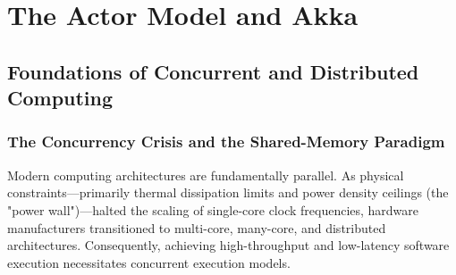 \chapter{The Actor Model and Akka}

\section{Foundations of Concurrent and Distributed Computing}

\subsection{The Concurrency Crisis and the Shared-Memory Paradigm}
Modern computing architectures are fundamentally parallel. As physical constraints—primarily thermal dissipation limits and power density ceilings (the "power wall")—halted the scaling of single-core clock frequencies, hardware manufacturers transitioned to multi-core, many-core, and distributed architectures. Consequently, achieving high-throughput and low-latency software execution necessitates concurrent execution models.

